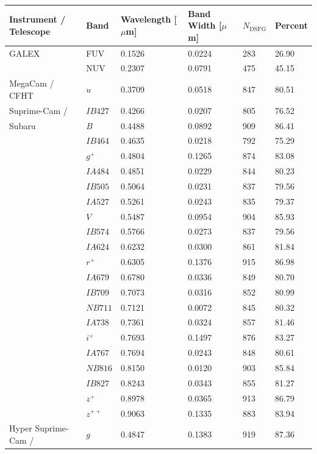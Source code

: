 \begin{table}
    \centering
    \begin{tabular}{p{4cm}|p{1.5cm}|p{2cm}|p{2cm}|p{1.5cm}|p{1.5cm}}
        \hline
		\hline
		Instrument / Telescope & Band & Wavelength [$\mu$m] & Band Width [$\mu$m] & $N_{\textrm{DSFG}}$ & Percent \\
		\hline
		\hline
		GALEX & FUV & 0.1526 & 0.0224 & 283 & 26.90 \\
		& NUV & 0.2307 & 0.0791 & 475 & 45.15 \\
		\hline
		MegaCam / CFHT & $u$ & 0.3709 & 0.0518 & 847 & 80.51 \\
		\hline
		Suprime-Cam / & $IB427$ & 0.4266 & 0.0207 & 805 & 76.52 \\
		Subaru & $B$ & 0.4488 & 0.0892 & 909 & 86.41 \\
		& $IB464$ & 0.4635 & 0.0218 & 792 & 75.29 \\
		& $g^+$ & 0.4804 & 0.1265 & 874 & 83.08 \\
		& $IA484$ & 0.4851 & 0.0229 & 844 & 80.23 \\
		& $IB505$ & 0.5064 & 0.0231 & 837 & 79.56 \\
		& $IA527$ & 0.5261 & 0.0243 & 835 & 79.37 \\
		& $V$ & 0.5487 & 0.0954 & 904 & 85.93 \\
		& $IB574$ & 0.5766 & 0.0273 & 837 & 79.56 \\
		& $IA624$ & 0.6232 & 0.0300 & 861 & 81.84 \\
		& $r^+$ & 0.6305 & 0.1376 & 915 & 86.98 \\
		& $IA679$ & 0.6780 & 0.0336 & 849 & 80.70 \\
		& $IB709$ & 0.7073 & 0.0316 & 852 & 80.99 \\
		& $NB711$ & 0.7121 & 0.0072 & 845 & 80.32 \\
		& $IA738$ & 0.7361 & 0.0324 & 857 & 81.46 \\
		& $i^+$ & 0.7693 & 0.1497 & 876 & 83.27 \\
		& $IA767$ & 0.7694 & 0.0243 & 848 & 80.61 \\
		& $NB816$ & 0.8150 & 0.0120 & 903 & 85.84 \\
		& $IB827$ & 0.8243 & 0.0343 & 855 & 81.27 \\
		& $z^+$ & 0.8978 & 0.0365 & 913 & 86.79 \\
		& $z^{++}$ & 0.9063 & 0.1335 & 883 & 83.94 \\
        \hline
		Hyper Suprime-Cam / & $g$ & 0.4847 & 0.1383 & 919 & 87.36 \\

\end{tabular}
\end{table}
